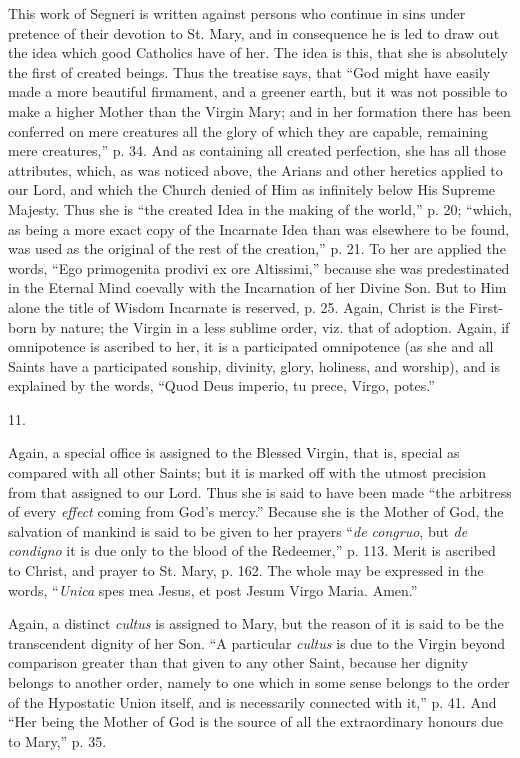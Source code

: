 This work of Segneri is written against persons who continue in
sins under pretence of their devotion to St. Mary, and in consequence
he is led to draw out the idea which good Catholics have of her. The
idea is this, that she is absolutely the first of created beings. Thus
the treatise says, that ``God might have easily made a more
beautiful firmament, and a greener earth, but it was not possible to
make a higher Mother than the Virgin Mary; and in her formation there
has been conferred on mere creatures all the glory of which they are
capable, remaining mere creatures,'' p. 34. And as containing all
created perfection, she has all those attributes, which, as was
noticed above, the Arians and other heretics applied to our Lord, and
which the Church denied of Him as infinitely below His Supreme
Majesty. Thus she is ``the created Idea in the making of the
world,'' p. 20; ``which, as being a more exact copy of the
Incarnate Idea than was elsewhere to be found, was used as the
original of the rest of the creation,'' p. 21. To her are applied
the words, ``Ego primogenita prodivi ex ore Altissimi,''
because she was predestinated in the Eternal Mind coevally with the
Incarnation of her Divine Son. But to Him alone the title of Wisdom
Incarnate is reserved, p. 25. Again, Christ is the First-born by
nature; the Virgin in a less sublime order, viz. that of adoption.
Again, if omnipotence is ascribed to her, it is a participated
omnipotence (as she and all Saints have a participated sonship,
divinity, glory, holiness, and worship), and is explained by the
words, ``Quod Deus imperio, tu prece, Virgo, potes.''

11.

Again, a special office is assigned to the Blessed Virgin, that is,
special as compared with all other Saints; but it is marked off with
the utmost precision from that assigned to our Lord. Thus she is said
to have been made ``the arbitress of every \emph{effect} coming
from God's mercy.'' Because she is the Mother of God, the
salvation of mankind is said to be given to her prayers ``\emph{de
congruo}, but \emph{de condigno} it is due only to the blood of the
Redeemer,'' p. 113. Merit is ascribed to Christ, and prayer to St.
Mary, p. 162. The whole may be expressed in the words, ``\emph{Unica}
spes mea Jesus, et post Jesum Virgo Maria. Amen.''

Again, a distinct \emph{cultus} is assigned to Mary, but the reason
of it is said to be the transcendent dignity of her Son. ``A
particular \emph{cultus} is due to the Virgin beyond comparison
greater than that given to any other Saint, because her dignity
belongs to another order, namely to one which in some sense belongs to
the order of the Hypostatic Union itself, and is necessarily connected
with it,'' p. 41. And ``Her being the Mother of God is the
source of all the extraordinary honours due to Mary,'' p. 35.

